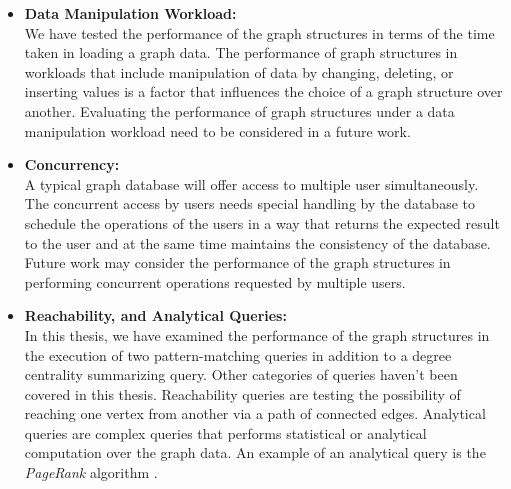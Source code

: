 {\begin{itemize}  

\item \textbf{Data Manipulation Workload:}\\
We have tested the performance of the graph structures in terms of the time taken in loading a graph data. The performance of graph structures in workloads that include manipulation of data by changing, deleting, or inserting values is a factor that influences the choice of a graph structure over another. Evaluating the performance of graph structures under a data manipulation workload need to be considered in a future work.

\item \textbf{Concurrency:}\\
A typical graph database will offer access to multiple user simultaneously. The concurrent access by users needs special handling by the database to schedule the operations of the users in a way that returns the expected result to the user and at the same time maintains the consistency of the database. Future work may consider the performance of the graph structures in performing concurrent operations requested by multiple users.

\item \textbf{Reachability, and Analytical Queries:}\\
In this thesis, we have examined the performance of the graph structures in the execution of two pattern-matching queries in addition to a degree centrality summarizing query. Other categories of queries haven't been covered in this thesis. Reachability queries are testing the possibility of reaching one vertex from another via a path of connected edges. Analytical queries are complex queries that performs statistical or analytical computation over the graph data. An example of an analytical query is the \textit{PageRank} algorithm \cite{Angles2018}.

\end{itemize}


}
